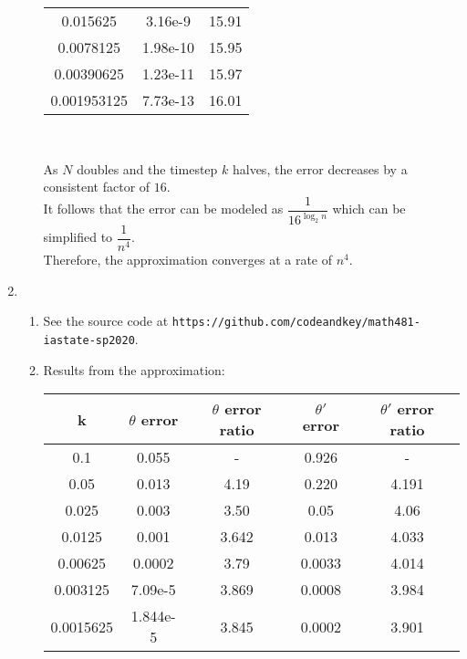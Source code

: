 \documentclass{article}
\begin{document}
\begin{enumerate}
\begin{enumerate}
\begin{center}
\begin{tabular}{| c | c | c |}
                        0.015625 & 3.16e-9 & 15.91 \\
                        0.0078125 & 1.98e-10 & 15.95 \\
                        0.00390625 & 1.23e-11 & 15.97 \\
                        0.001953125 & 7.73e-13 & 16.01 \\
                        \hline
                    \end{tabular} \\
                \end{center}
                As $N$ doubles and the timestep $k$ halves, the error decreases by a consistent factor of $16$. \\
                It follows that the error can be modeled as $\dfrac{1}{16^{\log_2{n}}}$ which can be simplified to $\dfrac{1}{n^4}$. \\
                Therefore, the approximation converges at a rate of $n^4$. \\
        \end{enumerate}
    \item
        \begin{enumerate}
            \item
                See the source code at \texttt{https://github.com/codeandkey/math481-iastate-sp2020}.\\
            \item
                Results from the approximation: \\
                \begin{center}
                    \begin{tabular}{| c | c | c | c | c |}
                        \hline
                        k & $\theta$ error & $\theta$ error ratio & $\theta'$ error & $\theta'$ error ratio \\
                        \hline
                        0.1 & 0.055 & - & 0.926 & - \\
                        0.05 & 0.013 & 4.19 & 0.220 & 4.191 \\
                        0.025 & 0.003 & 3.50 & 0.05 & 4.06 \\
                        0.0125 & 0.001 & 3.642 & 0.013 & 4.033 \\
                        0.00625 & 0.0002 & 3.79 & 0.0033 & 4.014 \\
                        0.003125 & 7.09e-5 & 3.869 & 0.0008 & 3.984 \\
                        0.0015625 & 1.844e-5 & 3.845 & 0.0002 & 3.901 \\
                        \hline
                    \end{tabular} \\
                \end{center}
        \end{enumerate}
\end{enumerate}
\end{document}
